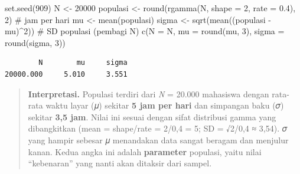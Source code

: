 \documentclass[
  indonesian,
  letterpaper,
]{book}
\newenvironment{Shaded}{\begin{snugshade}}{\end{snugshade}}
\newcommand{\AttributeTok}[1]{\textcolor[rgb]{0.40,0.45,0.13}{#1}}
\newcommand{\CommentTok}[1]{\textcolor[rgb]{0.37,0.37,0.37}{#1}}
\newcommand{\DecValTok}[1]{\textcolor[rgb]{0.68,0.00,0.00}{#1}}
\newcommand{\FloatTok}[1]{\textcolor[rgb]{0.68,0.00,0.00}{#1}}
\newcommand{\FunctionTok}[1]{\textcolor[rgb]{0.28,0.35,0.67}{#1}}
\newcommand{\NormalTok}[1]{\textcolor[rgb]{0.00,0.23,0.31}{#1}}
\newcommand{\OtherTok}[1]{\textcolor[rgb]{0.00,0.23,0.31}{#1}}
\newcommand{\SpecialCharTok}[1]{\textcolor[rgb]{0.37,0.37,0.37}{#1}}
\begin{document}
\begin{Shaded}
\begin{Highlighting}[]
\FunctionTok{set.seed}\NormalTok{(}\DecValTok{909}\NormalTok{)}
\NormalTok{N        }\OtherTok{\textless{}{-}} \DecValTok{20000}
\NormalTok{populasi }\OtherTok{\textless{}{-}} \FunctionTok{round}\NormalTok{(}\FunctionTok{rgamma}\NormalTok{(N, }\AttributeTok{shape =} \DecValTok{2}\NormalTok{, }\AttributeTok{rate =} \FloatTok{0.4}\NormalTok{), }\DecValTok{2}\NormalTok{) }\CommentTok{\# jam per hari}
\NormalTok{mu       }\OtherTok{\textless{}{-}} \FunctionTok{mean}\NormalTok{(populasi)}
\NormalTok{sigma    }\OtherTok{\textless{}{-}} \FunctionTok{sqrt}\NormalTok{(}\FunctionTok{mean}\NormalTok{((populasi }\SpecialCharTok{{-}}\NormalTok{ mu)}\SpecialCharTok{\^{}}\DecValTok{2}\NormalTok{))                 }\CommentTok{\# SD populasi (pembagi N)}
\FunctionTok{c}\NormalTok{(}\AttributeTok{N =}\NormalTok{ N, }\AttributeTok{mu =} \FunctionTok{round}\NormalTok{(mu, }\DecValTok{3}\NormalTok{), }\AttributeTok{sigma =} \FunctionTok{round}\NormalTok{(sigma, }\DecValTok{3}\NormalTok{))}
\end{Highlighting}
\end{Shaded}

\begin{verbatim}
        N        mu     sigma 
20000.000     5.010     3.551 
\end{verbatim}

\begin{quote}
\textbf{Interpretasi.} Populasi terdiri dari \emph{N} = 20.000 mahasiswa
dengan rata-rata waktu layar (𝜇) sekitar \textbf{5 jam per hari} dan
simpangan baku (𝜎) sekitar \textbf{3,5 jam}. Nilai ini sesuai dengan
sifat distribusi gamma yang dibangkitkan (mean = shape/rate = 2/0,4 = 5;
SD = √2/0,4 ≈ 3,54). 𝜎 yang hampir sebesar 𝜇 menandakan data sangat
beragam dan menjulur kanan. Kedua angka ini adalah \textbf{parameter}
populasi, yaitu nilai ``kebenaran'' yang nanti akan ditaksir dari
sampel.
\end{quote}
\end{document}
